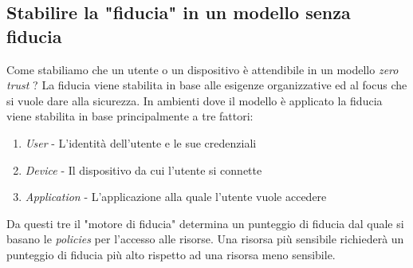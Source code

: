     \subsection{Stabilire la "fiducia" in un modello senza fiducia}
        Come stabiliamo che un utente o un dispositivo è attendibile in un modello \textit{zero trust} ?\newline
        La fiducia viene stabilita in base alle esigenze organizzative ed al focus che si vuole dare alla sicurezza. In ambienti dove il modello è applicato la fiducia viene stabilita in base principalmente a tre fattori: \begin{enumerate}
            \item \textit{User} - L'identità dell'utente e le sue credenziali
            \item \textit{Device} - Il dispositivo da cui l'utente si connette
            \item \textit{Application} - L'applicazione alla quale l'utente vuole accedere
        \end{enumerate}
        Da questi tre il "motore di fiducia" determina un punteggio di fiducia dal quale si basano le \textit{policies} per l'accesso alle risorse. Una risorsa più sensibile richiederà un punteggio di fiducia più alto rispetto ad una risorsa meno sensibile.